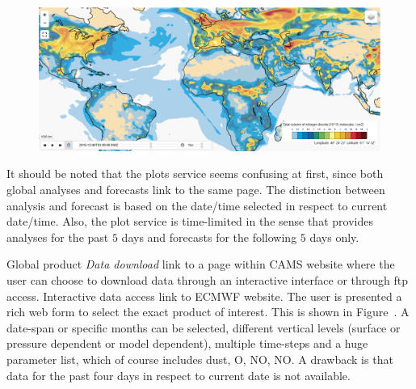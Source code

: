 \documentclass[9pt]{report}
\begin{document}
\begin{figure}[h!]%
\begin{mdcenter}%

\noindent{}\includegraphics[keepaspectratio=true,width=\dimmin{}{\dimwidth{0.90}}]{images/global_map}{}%

\mdhr{}%

\noindent{}%
\end{mdcenter}\label{global-map}%
\end{figure}%

\noindent{}It should be noted that the plots service seems confusing at first, since both global analyses and forecasts link to the same page.
The distinction between analysis and forecast is based on the date/time selected in respect to current date/time.
Also, the plot service is time-limited in the sense that provides analyses for the past $5$ days and forecasts for the following $5$ days only.%

Global product \emph{Data download} link to a page within CAMS website where the user can choose to download data through an interactive interface or through ftp access.
Interactive data access link to ECMWF website. The user is presented a rich web form to select the exact product of interest. This is shown in Figure~.
A date-span or specific months can be selected, different vertical levels (surface or pressure dependent or model dependent), multiple time-steps and a huge parameter list, which of course includes dust, O, NO, NO.
A drawback is that data for the past four days in respect to current date is not available.%
\end{document}
